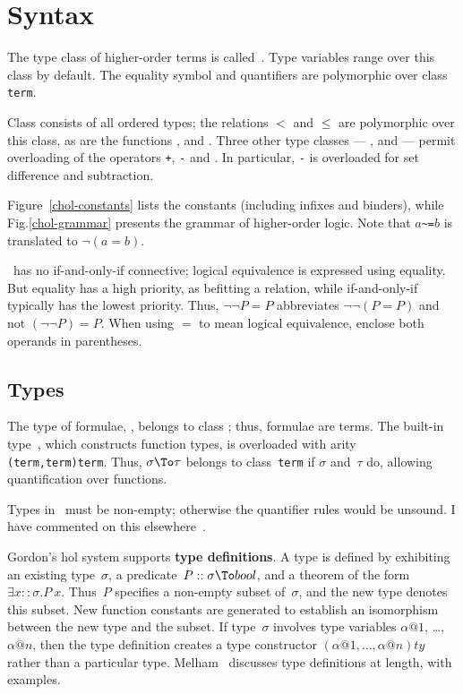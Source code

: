 \section{Syntax}
The type class of higher-order terms is called~.  Type variables
range over this class by default.  The equality symbol and quantifiers are
polymorphic over class {\tt term}.

Class  consists of all ordered types; the relations $<$ and
$\leq$ are polymorphic over this class, as are the functions
,  and .  Three other
type classes --- ,  and  --- permit
overloading of the operators {\tt+}, {\tt-} and {\tt*}.  In particular,
{\tt-} is overloaded for set difference and subtraction.

Figure~\ref{chol-constants} lists the constants (including infixes and
binders), while Fig.\ts\ref{chol-grammar} presents the grammar of
higher-order logic.  Note that $a$\verb|~=|$b$ is translated to
$\neg(a=b)$.

\begin{warn}
  \CHOL\ has no if-and-only-if connective; logical equivalence is expressed
  using equality.  But equality has a high priority, as befitting a
  relation, while if-and-only-if typically has the lowest priority.  Thus,
  $\neg\neg P=P$ abbreviates $\neg\neg (P=P)$ and not $(\neg\neg P)=P$.
  When using $=$ to mean logical equivalence, enclose both operands in
  parentheses.
\end{warn}

\subsection{Types}\label{CHOL-types}
The type of formulae, , belongs to class ; thus,
formulae are terms.  The built-in type~, which constructs function
types, is overloaded with arity {\tt(term,term)term}.  Thus, $\sigma\To\tau$
belongs to class~{\tt term} if $\sigma$ and~$\tau$ do, allowing quantification
over functions.

Types in \CHOL\ must be non-empty; otherwise the quantifier rules would be
unsound.  I have commented on this elsewhere~\cite[\S7]{paulson-COLOG}.

Gordon's {\sc hol} system supports {\bf type definitions}.  A type is
defined by exhibiting an existing type~$\sigma$, a predicate~$P::\sigma\To
bool$, and a theorem of the form $\exists x::\sigma.P~x$.  Thus~$P$
specifies a non-empty subset of~$\sigma$, and the new type denotes this
subset.  New function constants are generated to establish an isomorphism
between the new type and the subset.  If type~$\sigma$ involves type
variables $\alpha@1$, \ldots, $\alpha@n$, then the type definition creates
a type constructor $(\alpha@1,\ldots,\alpha@n)ty$ rather than a particular
type.  Melham~\cite{melham89} discusses type definitions at length, with
examples. 

